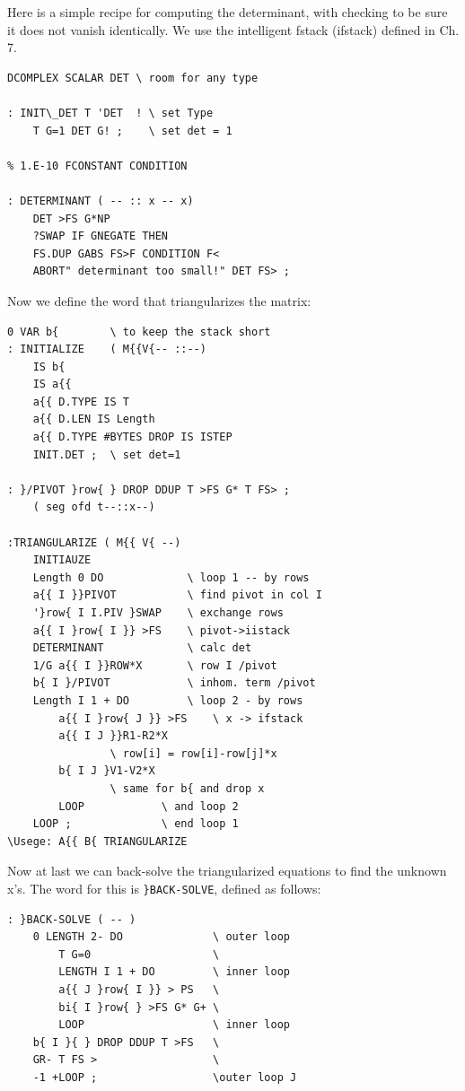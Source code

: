 Here is a simple recipe for computing the determinant, with checking to be sure it does not vanish identically. We use the intelligent fstack (ifstack) defined in Ch. 7.

\begin{verbatim}
DCOMPLEX SCALAR DET \ room for any type

: INIT\_DET T 'DET  ! \ set Type
    T G=1 DET G! ;    \ set det = 1

% 1.E-10 FCONSTANT CONDITION

: DETERMINANT ( -- :: x -- x)
    DET >FS G*NP
    ?SWAP IF GNEGATE THEN
    FS.DUP GABS FS>F CONDITION F<
    ABORT" determinant too small!" DET FS> ;
\end{verbatim} 


Now we define the word that triangularizes the matrix:
\begin{verbatim}
0 VAR b{        \ to keep the stack short
: INITIALIZE    ( M{{V{-- ::--)
    IS b{
    IS a{{
    a{{ D.TYPE IS T
    a{{ D.LEN IS Length
    a{{ D.TYPE #BYTES DROP IS ISTEP
    INIT.DET ;  \ set det=1

: }/PIVOT }row{ } DROP DDUP T >FS G* T FS> ;
    ( seg ofd t--::x--)

:TRIANGULARIZE ( M{{ V{ --)
    INITIAUZE
    Length 0 DO             \ loop 1 -- by rows
    a{{ I }}PIVOT           \ find pivot in col I
    '}row{ I I.PIV }SWAP    \ exchange rows
    a{{ I }row{ I }} >FS    \ pivot->iistack
    DETERMINANT             \ calc det
    1/G a{{ I }}ROW*X       \ row I /pivot
    b{ I }/PIVOT            \ inhom. term /pivot
    Length I 1 + DO         \ loop 2 - by rows
        a{{ I }row{ J }} >FS    \ x -> ifstack
        a{{ I J }}R1-R2*X 
                \ row[i] = row[i]-row[j]*x
        b{ I J }V1-V2*X
                \ same for b{ and drop x
        LOOP            \ and loop 2
    LOOP ;              \ end loop 1
\Usege: A{{ B{ TRIANGULARIZE
\end{verbatim}

Now at last we can back-solve the triangularized equations to find the unknown x's. The word for this is \verb|}BACK-SOLVE|, defined as follows:


\begin{verbatim}
: }BACK-SOLVE ( -- )
    0 LENGTH 2- DO              \ outer loop
        T G=0                   \
        LENGTH I 1 + DO         \ inner loop
        a{{ J }row{ I }} > PS   \
        bi{ I }row{ } >FS G* G+ \
        LOOP                    \ inner loop
    b{ I }{ } DROP DDUP T >FS   \
    GR- T FS >                  \
    -1 +LOOP ;                  \outer loop J
\end{verbatim} 

